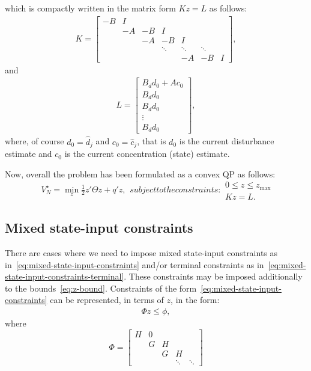 \documentclass[12pt]{scrartcl}
\begin{document}
which is compactly written in the matrix form $Kz = L$ as follows:
\begin{align}
K=\left[\begin{array}{ccccccc}
-B & I\\
& -A & -B &I\\
&& -A & -B &I\\
&&&\ddots & \ddots & \ddots\\
&&&&-A&-B&I
\end{array}\right],
\end{align}
and
\begin{align}
L=\left[
\begin{array}{c}
B_d d_0 + Ac_0\\
B_d d_0\\
B_d d_0\\
\vdots\\
B_d d_0
\end{array}\right],
\end{align}
where, of course $d_0=\hat{d}_j$ and $c_0=\hat{c}_j$, that is
$d_0$ is the current disturbance estimate and $c_0$ is the current
concentration (state) estimate.

Now, overall the problem has been formulated as a convex QP as follows:
\begin{subequations}
\begin{align}
V_N^\star = \min_{z} \frac{1}{2}z'\Theta z + q'z,
\end{align}
subject to the constraints:
\begin{align}
0 \leq z \leq z_{\max}\label{eq:z-bound}\\
Kz = L.
\end{align}
\end{subequations}

\subsection*{Mixed state-input constraints}
There are cases where we need to impose mixed state-input constraints 
as in~\eqref{eq:mixed-state-input-constraints} and/or
terminal constraints as in~\eqref{eq:mixed-state-input-constraints-terminal}.
These constraints may be imposed additionally to the bounds~\eqref{eq:z-bound}.
Constraints of the form~\eqref{eq:mixed-state-input-constraints} can be 
represented, in terms of $z$, in the form:
\begin{align}
\Phi z \leq \phi,
\end{align}
where
\begin{equation}
\Phi=\left[\begin{array}{ccccc}
H & 0\\
& G  & H\\
&& G & H \\
&&& \ddots & \ddots
\end{array}\right]
\end{equation}




\end{document}

